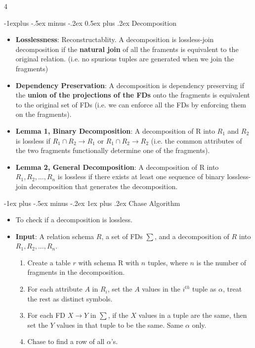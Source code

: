 \documentclass[10pt, landscape]{article}
\makeatletter
\renewcommand{\subsection}{\@startsection{subsection}{2}{0mm}%
  {-1explus -.5ex minus -.2ex}%
  {0.5ex plus .2ex}%
{\normalfont\normalsize\bfseries}}
\renewcommand{\subsubsection}{\@startsection{subsubsection}{3}{0mm}%
  {-1ex plus -.5ex minus -.2ex}%
  {1ex plus .2ex}%
{\normalfont\small\bfseries}}%
\makeatother
\begin{document}
\begin{multicols*}{4}
\begin{itemize}
  \end{itemize}

  \subsection{Decomposition}
  \begin{itemize}
    \item \textbf{Losslessness}: Reconstructablity. A decomposition is lossless-join decomposition if the \textbf{natural join} of all the framents is equivalent to the original relation. (i.e. no spurious tuples are generated when we join the fragments)
    \item \textbf{Dependency Preservation}: A decomposition is dependency preserving if the \textbf{union of the projections of the FDs} onto the fragments is equivalent to the original set of FDs (i.e. we can enforce all the FDs by enforcing them on the fragments).
    \item \textbf{Lemma 1, Binary Decomposition}: A decomposition of R into $R_1$ and $R_2$ is lossless if $R_1 \cap R_2 \rightarrow R_1$ or $R_1 \cap R_2 \rightarrow R_2$ (i.e. the common attributes of the two fragments functionally determine one of the fragments).
    \item \textbf{Lemma 2, General Decomposition}: A decomposition of R into $R_1, R_2, ..., R_n$ is lossless if there exists at least one sequence of binary lossless-join decomposition that generates the decomposition.
  \end{itemize}

  \subsubsection{Chase Algorithm}
  \begin{itemize}
    \item To check if a decomposition is lossless.
    \item \textbf{Input}: A relation schema $R$, a set of FDs $\sum$, and a decomposition of $R$ into $R_1, R_2, ..., R_n$.
    \begin{enumerate}
        \item Create a table $r$ with schema R with $n$ tuples, where $n$ is the number of fragments in the decomposition. 
        \item For each attribute $A$ in $R_i$, set the $A$ values in the $i^{th}$ tuple as $\alpha$, treat the rest as distinct symbols.
        \item For each FD $X \rightarrow Y$ in $\sum$, if the $X$ values in a tuple are the same, then set the $Y$ values in that tuple to be the same. Same $\alpha$ only.
        \item Chase to find a row of all $\alpha$'s.
    \end{enumerate}
  \end{itemize}


\end{multicols*}
\end{document}
